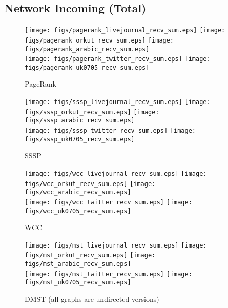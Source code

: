 \documentclass{article}
\newcommand{\bline}[1][1]{\vspace{#1\baselineskip}}
\begin{document}
\pagebreak
\subsection{Network Incoming (Total)}
\begin{figure}[!h]
  \bline[1]
  \centering
  \texttt{[image: figs/pagerank\_livejournal\_recv\_sum.eps]}\hspace{1em}%
  \texttt{[image: figs/pagerank\_orkut\_recv\_sum.eps]}\hspace{1em}%
  \texttt{[image: figs/pagerank\_arabic\_recv\_sum.eps]}\\
  \texttt{[image: figs/pagerank\_twitter\_recv\_sum.eps]}\hspace{1em}%
  \texttt{[image: figs/pagerank\_uk0705\_recv\_sum.eps]}
  \caption{PageRank}
\end{figure}

\begin{figure}[!h]
  \bline[3.5]
  \centering
  \texttt{[image: figs/sssp\_livejournal\_recv\_sum.eps]}\hspace{1em}%
  \texttt{[image: figs/sssp\_orkut\_recv\_sum.eps]}\hspace{1em}%
  \texttt{[image: figs/sssp\_arabic\_recv\_sum.eps]}\\
  \texttt{[image: figs/sssp\_twitter\_recv\_sum.eps]}\hspace{1em}%
  \texttt{[image: figs/sssp\_uk0705\_recv\_sum.eps]}
  \caption{SSSP}
\end{figure}

\begin{figure}[!h]
  \bline[3.5]
  \centering
  \texttt{[image: figs/wcc\_livejournal\_recv\_sum.eps]}\hspace{1em}%
  \texttt{[image: figs/wcc\_orkut\_recv\_sum.eps]}\hspace{1em}%
  \texttt{[image: figs/wcc\_arabic\_recv\_sum.eps]}\\
  \texttt{[image: figs/wcc\_twitter\_recv\_sum.eps]}\hspace{1em}%
  \texttt{[image: figs/wcc\_uk0705\_recv\_sum.eps]}
  \caption{WCC}
\end{figure}

\begin{figure}[!h]
  \bline[3.5]
  \centering
  \texttt{[image: figs/mst\_livejournal\_recv\_sum.eps]}\hspace{1em}%
  \texttt{[image: figs/mst\_orkut\_recv\_sum.eps]}\hspace{1em}%
  \texttt{[image: figs/mst\_arabic\_recv\_sum.eps]}\\
  \texttt{[image: figs/mst\_twitter\_recv\_sum.eps]}\hspace{1em}%
  \texttt{[image: figs/mst\_uk0705\_recv\_sum.eps]}
  \caption{DMST (all graphs are undirected versions)}
\end{figure}
\end{document}
